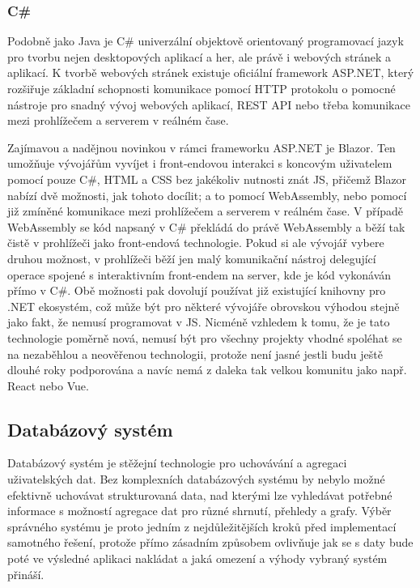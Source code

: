 		\subsubsection{C\#}

		Podobně jako Java je C\# univerzální objektově orientovaný programovací jazyk pro tvorbu nejen
		desktopových aplikací a her, ale právě i webových stránek a aplikací.
		K tvorbě webových stránek existuje oficiální framework ASP.NET, který rozšiřuje základní schopnosti
		komunikace pomocí \Ac{HTTP} protokolu o pomocné nástroje pro snadný vývoj webových aplikací, \Ac{REST} API nebo třeba
		komunikace mezi prohlížečem a serverem v reálném čase. \cite{asp_net}

		Zajímavou a nadějnou novinkou v rámci frameworku ASP.NET je Blazor.
		Ten umožňuje vývojářům vyvíjet i front-endovou interakci s koncovým uživatelem pomocí pouze C\#, \Ac{HTML} a \Ac{CSS}
		bez jakékoliv nutnosti znát \ac{JS}, přičemž Blazor nabízí dvě možnosti, jak tohoto docílit; a to pomocí
		WebAssembly, nebo pomocí již zmíněné komunikace mezi prohlížečem a serverem v reálném čase.
		V případě WebAssembly se kód napsaný v C\# překládá do právě WebAssembly a běží tak čistě v prohlížeči
		jako front-endová technologie.
		Pokud si ale vývojář vybere druhou možnost, v prohlížeči běží jen malý komunikační nástroj delegující operace
		spojené s interaktivním front-endem na server, kde je kód vykonáván přímo v C\#.
		Obě možnosti pak dovolují používat již existující knihovny pro .NET ekosystém, což může být pro některé vývojáře
		obrovskou výhodou stejně jako fakt, že nemusí programovat v \ac{JS}.
		Nicméně vzhledem k tomu, že je tato technologie poměrně nová, nemusí být pro všechny projekty vhodné spoléhat
		se na nezaběhlou a neověřenou technologii, protože není jasné jestli budu ještě dlouhé roky podporována a
		navíc nemá z daleka tak velkou komunitu jako např. React nebo Vue. \cite{blazor}


	\subsection{Databázový systém}

	Databázový systém je stěžejní technologie pro uchovávání a agregaci uživatelských dat.
	Bez komplexních databázových systému by nebylo možné efektivně uchovávat strukturovaná data, nad kterými lze vyhledávat potřebné
	informace s možností agregace dat pro různé shrnutí, přehledy a grafy.
	Výběr správného systému je proto jedním z nejdůležitějších kroků před implementací samotného řešení, protože přímo
	zásadním způsobem ovlivňuje jak se s daty bude poté ve výsledné aplikaci nakládat a jaká omezení a výhody vybraný
	systém přináší.

